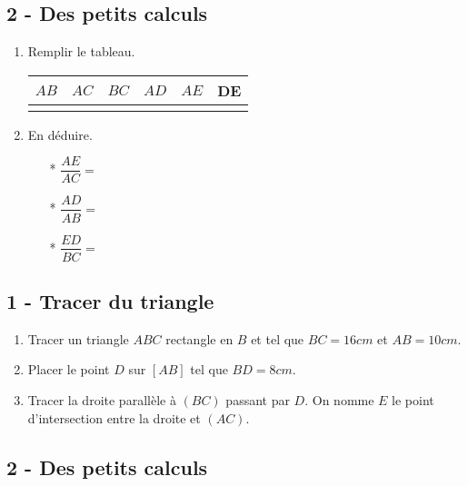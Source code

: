 \documentclass[11pt]{article}
\begin{document}
\subsection*{2 - Des petits calculs}

\begin{enumerate}

\item Remplir le tableau.
  \begin{center}
    \begin{tabular}{| c | c | c | c | c | c |}
      \hline
      $AB$    & $AC$ & $BC$ & $AD$ & $AE$  & DE \\
      \hline
      \phantom{1234567890} & \phantom{1234567890} & \phantom{1234567890} & \phantom{1234567890} & \phantom{1234567890} &  \phantom{1234567890} \\
      \hline
    \end{tabular}
  \end{center}

\item En déduire.
  \begin{multicols}{3}
    \begin{itemize}
    \item[*] $\dfrac{AE}{AC} = $
    \item[*] $\dfrac{AD}{AB} = $
    \item[*] $\dfrac{ED}{BC} = $
    \end{itemize}
  \end{multicols}
\end{enumerate}

\subsection*{1 - Tracer du triangle}

\begin{enumerate}
\item Tracer un triangle $ABC$ rectangle en $B$ et tel que $BC = 16cm$ et $AB = 10cm$.
\item Placer le point $D$ sur $[AB]$ tel que $BD = 8cm$.
\item Tracer la droite parallèle à $(BC)$ passant par $D$. On nomme $E$ le point d'intersection entre la droite et $(AC)$.
\end{enumerate}

\subsection*{2 - Des petits calculs}
\end{document}
